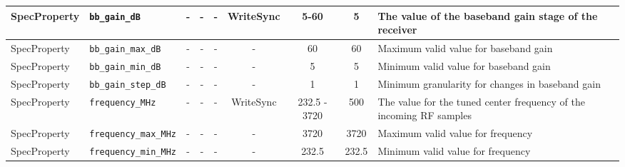 \documentclass{article}
\begin{document}
\begin{landscape}
\begin{scriptsize}
\begin{tabular}{|p{2cm}|p{4cm}|c|c|c|c|c|c|p{6.5cm}|}
			\hline
			SpecProperty & \verb+bb_gain_dB+                   & -    & -        & -          & WriteSync      & 5-60         & 5       & The value of the baseband gain stage of the receiver                                                                                                                                                                        \\
			\hline
			SpecProperty & \verb+bb_gain_max_dB+               & -    & -        & -          & -              & 60           & 60      & Maximum valid value for baseband gain                                                                                                                                                                                       \\
			\hline
			SpecProperty & \verb+bb_gain_min_dB+               & -    & -        & -          & -              & 5            & 5       & Minimum valid value for baseband gain                                                                                                                                                                                       \\
			\hline
			SpecProperty & \verb+bb_gain_step_dB+              & -    & -        & -          & -              & 1            & 1       & Minimum granularity for changes in baseband gain                                                                                                                                                                            \\
			\hline
			SpecProperty & \verb+frequency_MHz+                & -    & -        & -          & WriteSync      & 232.5 - 3720 & 500     & The value for the tuned center frequency of the incoming RF samples                                                                                                                                                         \\
			\hline
			SpecProperty & \verb+frequency_max_MHz+            & -    & -        & -          & -              & 3720         & 3720    & Maximum valid value for frequency                                                                                                                                                                                           \\
			\hline
			SpecProperty & \verb+frequency_min_MHz+            & -    & -        & -          & -              & 232.5        & 232.5   & Minimum valid value for frequency                                                                                                                                                                                           \\

\end{tabular}
\end{scriptsize}
\end{landscape}
\end{document}
